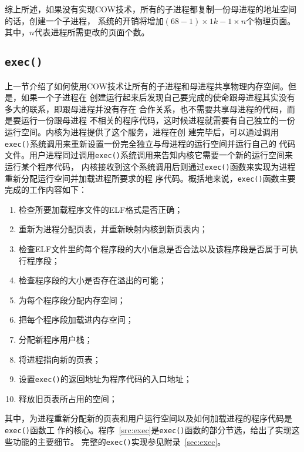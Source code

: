 \documentclass{swfuthesism}
\begin{document}
综上所述，如果没有实现COW技术，所有的子进程都复制一份母进程的地址空间的话，创建一个子进程，
系统的开销将增加$(68-1)\times{}1k - 1\times{}n$个物理页面。其中，$n$代表进程所需更改的页面个数。

\subsection{\texttt{exec()}}

上一节介绍了如何使用COW技术让所有的子进程和母进程共享物理内存空间。但是，如果一个子进程在
创建运行起来后发现自己要完成的使命跟母进程其实没有多大的联系，即跟母进程并没有存在
合作关系，也不需要共享母进程的代码，而是要运行一份跟母进程
不相关的程序代码，这时候进程就需要有自己独立的一份运行空间。内核为进程提供了这个服务，进程在创
建完毕后，可以通过调用\texttt{exec()}系统调用来重新设置一份完全独立与母进程的运行空间并运行自己的
代码文件。用户进程同过调用\texttt{exec()}系统调用来告知内核它需要一个新的运行空间来运行某个程序代码，
内核接收到这个系统调用后则通过\texttt{exec()}函数来实现为进程重新分配运行空间并加载进程所要求的程
序代码。概括地来说，\texttt{exec()}函数主要完成的工作内容如下：

\begin{enumerate}
\item 检查所要加载程序文件的ELF格式是否正确；
\item 重新为进程分配页表，并重新映射内核到新页表内；
\item 检查ELF文件里的每个程序段的大小信息是否合法以及该程序段是否属于可执行程序段；
\item 检查程序段的大小是否存在溢出的可能；
\item 为每个程序段分配内存空间；
\item 把每个程序段加载进内存空间；
\item 分配新程序用户栈；
\item 将进程指向新的页表；
\item 设置\texttt{exec()}的返回地址为程序代码的入口地址；
\item 释放旧页表所占用的空间；
\end{enumerate}
其中，为进程重新分配新的页表和用户运行空间以及如何加载进程的程序代码是\texttt{exec()}函数工
作的核心。程序~\ref{src:exec}是\texttt{exec()}函数的部分节选，给出了实现这些功能的主要细节。
完整的\texttt{exec()}实现参见附录~\ref{sec:exec}。
\end{document}
